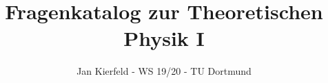 

\title{Fragenkatalog zur Theoretischen Physik I}
\date{Jan Kierfeld - WS 19/20 - TU Dortmund}



\maketitle
\thispagestyle{empty}
\newpage





